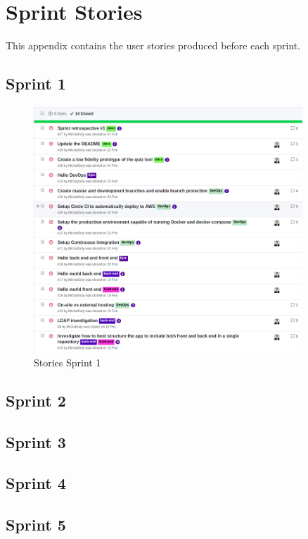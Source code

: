 \chapter{Sprint Stories}
\label{chap:spintstories}

This appendix contains the user stories produced before each sprint. 

\section{Sprint 1}
\begin{figure}[ht]
    \centering
    \includegraphics[width=0.9\textwidth]{Appendix3/1.jpg}
    \caption{Stories Sprint 1}
    \label{fig:sprintstories1}
\end{figure}

\section{Sprint 2}
\section{Sprint 3}
\section{Sprint 4}
\section{Sprint 5}
